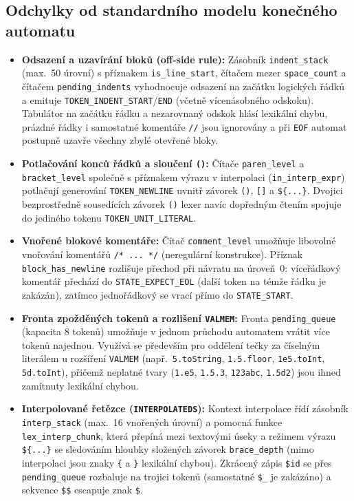 \documentclass[11pt, a4paper]{article}
\begin{document}
\subsection*{Odchylky od standardního modelu konečného automatu}
\begin{itemize}[topsep=3pt, itemsep=3pt]
  \item \textbf{Odsazení a uzavírání bloků (off-side rule):} Zásobník \texttt{indent\_stack} (max.\ 50 úrovní) s příznakem \texttt{is\_line\_start}, čítačem mezer \texttt{space\_count} a čítačem \texttt{pending\_indents} vyhodnocuje odsazení na začátku logických řádků a emituje \texttt{TOKEN\_INDENT\_START}/\texttt{END} (včetně vícenásobného odskoku). Tabulátor na začátku řádku a nezarovnaný odskok hlásí lexikální chybu, prázdné řádky i samostatné komentáře \texttt{//} jsou ignorovány a při \texttt{EOF} automat postupně uzavře všechny zbylé otevřené bloky.
  \item \textbf{Potlačování konců řádků a sloučení \texttt{()}:} Čítače \texttt{paren\_level} a \texttt{bracket\_level} společně s příznakem výrazu v interpolaci (\texttt{in\_interp\_expr}) potlačují generování \texttt{TOKEN\_NEWLINE} uvnitř závorek \texttt{()}, \texttt{[]} a \texttt{\$\{...\}}. Dvojici bezprostředně sousedících závorek \texttt{()} lexer navíc dopředným čtením spojuje do jediného tokenu \texttt{TOKEN\_UNIT\_LITERAL}.
  \item \textbf{Vnořené blokové komentáře:} Čítač \texttt{comment\_level} umožňuje libovolné vnořování komentářů \texttt{/* ... */} (neregulární konstrukce). Příznak \texttt{block\_has\_newline} rozlišuje přechod při návratu na úroveň~0: víceřádkový komentář přechází do \texttt{STATE\_EXPECT\_EOL} (další token na témže řádku je zakázán), zatímco jednořádkový se vrací přímo do \texttt{STATE\_START}.
  \item \textbf{Fronta zpožděných tokenů a rozlišení \texttt{VALMEM}:} Fronta \texttt{pending\_queue} (kapacita 8 tokenů) umožňuje v jednom průchodu automatem vrátit více tokenů najednou. Využívá se především pro oddělení tečky za číselným literálem u rozšíření \texttt{VALMEM} (např.\ \texttt{5.toString}, \texttt{1.5.floor}, \texttt{1e5.toInt}, \texttt{5d.toInt}), přičemž neplatné tvary (\texttt{1.e5}, \texttt{1.5.3}, \texttt{123abc}, \texttt{1.5d2}) jsou ihned zamítnuty lexikální chybou.
  \item \textbf{Interpolované řetězce (\texttt{INTERPOLATEDS}):} Kontext interpolace řídí zásobník \texttt{interp\_stack} (max.\ 16 vnořených úrovní) a pomocná funkce \texttt{lex\_interp\_chunk}, která přepíná mezi textovými úseky a režimem výrazu \texttt{\$\{...\}} se sledováním hloubky složených závorek \texttt{brace\_depth} (mimo interpolaci jsou znaky \texttt{\{} a \texttt{\}} lexikální chybou). Zkrácený zápis \texttt{\$id} se přes \texttt{pending\_queue} rozbaluje na trojici tokenů (samostatné \texttt{\$\_} je zakázáno) a sekvence \texttt{\$\$} escapuje znak \texttt{\$}.

\end{itemize}
\end{document}
